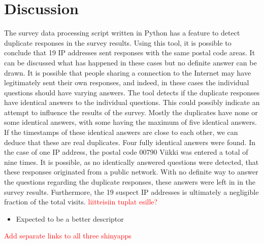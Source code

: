 \section{Discussion}
\justify


The survey data processing script written in Python has a feature to detect duplicate responses in the survey results. Using this tool, it is possible to conclude that 19 IP addresses sent responses with the same postal code areas. It can be discussed what has happened in these cases but no definite answer can be drawn. It is possible that people sharing a connection to the Internet may have legitimately sent their own responses, and indeed, in these cases the individual questions should have varying answers. The tool detects if the duplicate responses have identical answers to the individual questions. This could possibly indicate an attempt to influence the results of the survey. Mostly the duplicates have none or some identical answers, with some having the maximum of five identical answers. If the timestamps of these identical answers are close to each other, we can deduce that these are real duplicates. Four fully identical answers were found. In the case of one IP address, the postal code 00790 Viikki was entered a total of nine times. It is possible, as no identically answered questions were detected, that these responses originated from a public network. With no definite way to answer the questions regarding the duplicate responses, these answers were left in in the survey results. Furthermore, the 19 suspect IP addresses is ultimately a negligible fraction of the total visits. \textcolor{red}{liitteisiin tuplat esille?}

\begin{itemize}
    \item Expected  to be a better descriptor
\end{itemize}

\textcolor{red}{Add separate links to all three shinyapps}
